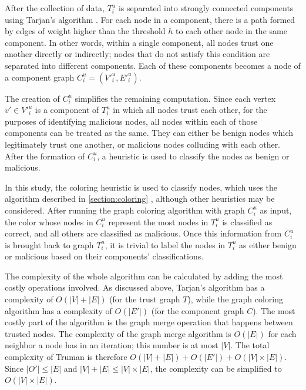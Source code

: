\documentclass[conference]{IEEEtran}
\begin{document}

After the collection of data, $T^u_i$ is separated into strongly connected components using Tarjan's algorithm \cite{tarjan1972depth}.
For each node in a component, there is a path formed by edges of weight higher than the threshold $h$ to each other node in the same component.
In other words, within a single component, all nodes trust one another directly or indirectly; nodes that do not satisfy this condition are separated into different components.
Each of these components becomes a node of a component graph $C^u_i = (V'^u_i, E'^u_i)$.

The creation of $C^u_i$ simplifies the remaining computation.
Since each vertex $v' \in V'^u_i$ is a component of $T^u_i$ in which all nodes trust each other, for the purposes of identifying malicious nodes, all nodes within each of those components can be treated as the same.
They can either be benign nodes which legitimately trust one another, or malicious nodes colluding with each other.
After the formation of $C^u_i$, a heuristic is used to classify the nodes as benign or malicious.


In this study, the coloring heuristic is used to classify nodes, which uses the algorithm described in \autoref{section:coloring} \cite{mittal2011graph}, although other heuristics may be considered.
After running the graph coloring algorithm with graph $C^u_i$ as input, the color whose nodes in $C^u_i$ represent the most nodes in $T^u_i$ is classified as correct, and all others are classified as malicious.
Once this information from $C^u_i$ is brought back to graph $T^u_i$, it is trivial to label the nodes in $T^u_i$ as either benign or malicious based on their components' classifications.


The complexity of the whole algorithm can be calculated by adding the most costly operations involved.
As discussed above, Tarjan's algorithm has a complexity of $O(|V|+|E|)$ (for the trust graph $T$), while the graph coloring algorithm has a complexity of $O(|E'|)$ (for the component graph $C$).
The most costly part of the algorithm is the graph merge operation that happens between trusted nodes.
The complexity of the graph merge algorithm is $O(|E|)$ for each neighbor a node has in an iteration; this number is at most $|V|$.
The total complexity of Truman is therefore $O(|V|+|E|)+O(|E'|)+O(|V|\times |E|)$.
Since $|O'| \leq |E|$ and $|V|+|E| \leq |V|\times |E|$, the complexity can be simplified to $O(|V| \times |E|)$.
\end{document}
